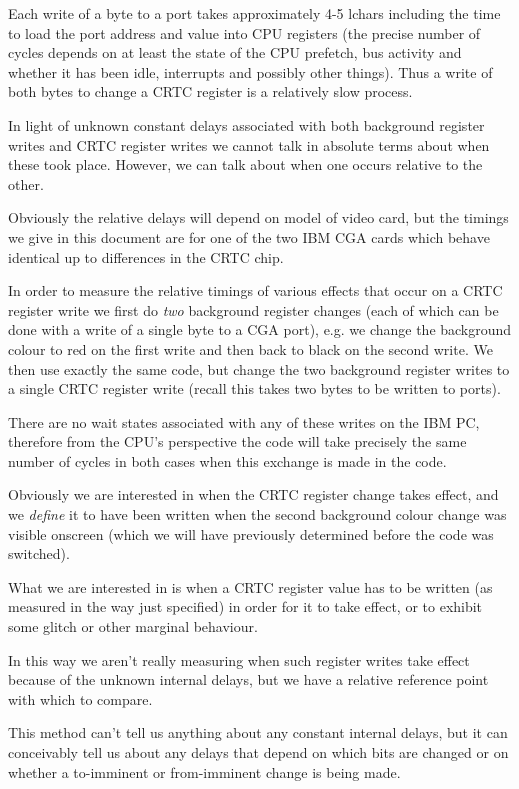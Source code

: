 \documentclass[a4paper,10pt]{amsart}
\begin{document}
Each write of a byte to a port takes approximately 4-5 lchars including the time
to load the port address and value into CPU registers (the precise number of
cycles depends on at least the state of the CPU prefetch, bus activity and
whether it has been idle, interrupts and possibly other things). Thus a write of
both bytes to change a CRTC register is a relatively slow process.

In light of unknown constant delays associated with both background register
writes and CRTC register writes we cannot talk in absolute terms about when
these took place. However, we can talk about when one occurs relative to the
other.

Obviously the relative delays will depend on model of video card, but the
timings we give in this document are for one of the two IBM CGA cards which
behave identical up to differences in the CRTC chip.

In order to measure the relative timings of various effects that occur on a
CRTC register write we first do \emph{two} background register changes (each of
which can be done with a write of a single byte to a CGA port), e.g. we change
the background colour to red on the first write and then back to black on the
second write. We then use exactly the same code, but change the two background
register writes to a single CRTC register write (recall this takes two bytes to
be written to ports).

There are no wait states associated with any of these writes on the IBM PC,
therefore from the CPU's perspective the code will take precisely the same
number of cycles in both cases when this exchange is made in the code.

Obviously we are interested in when the CRTC register change takes effect,
and we \emph{define} it to have been written when the second background colour
change was visible onscreen (which we will have previously determined before
the code was switched).

What we are interested in is when a CRTC register value has to be written (as
measured in the way just specified) in order for it to take effect, or to
exhibit some glitch or other marginal behaviour.

In this way we aren't really measuring when such register writes take effect
because of the unknown internal delays, but we have a relative reference point
with which to compare.

This method can't tell us anything about any constant internal delays, but it
can conceivably tell us about any delays that depend on which bits are changed
or on whether a to-imminent or from-imminent change is being made.
\end{document}
